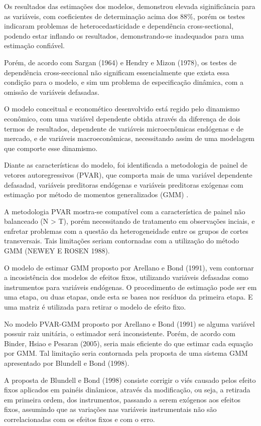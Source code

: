 \documentclass[12pt,12pt,openright,oneside,a4paper,chapter=TITLE,section=TITLE,subsection=TITLE,subsubsection=TITLE,english,french,spanish,portugues,sumario=tradicional]{abntex2}
\begin{document}
Os resultados das estimações dos modelos, demonstrou elevada siginificância para as variáveis, com coeficientes de determinação acima dos 88\%, porém os testes indicaram problemas de heterocedasticidade e dependência cross-sectional, podendo estar inflando os resultados, demonstrando-se inadequados para uma estimação confiável.

Porém, de acordo com Sargan (1964) e Hendry e Mizon (1978), os testes de dependência cross-seccional não significam essencialmente que exista essa condição para o modelo, e sim um problema de especificação dinâmica, com a omissão de variáveis defasadas.

O modelo conceitual e economético desenvolvido está regido pelo dinamismo econômico, com uma variável dependente obtida através da diferença de dois termos de resultados, dependente de variáveis microecnômicas endógenas e de mercado, e de variáveis macroeconômicas, necessitando assim de uma modelagem que comporte esse dinamismo.

Diante as características do modelo, foi identificada a metodologia de painel de vetores autoregressivos (PVAR), que comporta mais de uma variável dependente defasadad, variáveis preditoras endógenas e variáveis preditoras exógenas com estimação por método de momentos generalizados (GMM) .

A metodologia PVAR mostra-se compatível com a característica de painel não balanceado (N \textgreater{} T), porém necessitando de tratamento em observações inciais, e enfretar problemas com a questão da heterogeneidade entre os grupos de cortes transversais. Tais limitações seriam contornadas com a utilização do método GMM (\uppercase{Newey e Rosen} 1988).

O modelo de estimar GMM proposto por Arellano e Bond (1991), vem contornar a incosistência dos modelos de efeitos fixos, utilizando variáveis defasadas como instrumentos para variáveis endógenas. O procedimento de estimação pode ser em uma etapa, ou duas etapas, onde esta se basea nos resíduos da primeira etapa. E uma matriz é utilizada para retirar o modelo de efeito fixo.

No modelo PVAR-GMM proposto por Arellano e Bond (1991) se alguma variável possuir raiz unitária, o estimador será inconsistente. Porém, de acordo com Binder, Hsiao e Pesaran (2005), seria mais eficiente do que estimar cada equação por GMM. Tal limitação seria contornada pela proposta de uma sistema GMM apresentado por Blundell e Bond (1998).

A proposta de Blundell e Bond (1998) consiste corrigir o viés causado pelos efeito fixos aplicados em painéis dinâmicos, através da modificação, ou seja, a retirada em primeira ordem, dos instrumentos, passando a serem exógenos aos efeitos fixos, assumindo que as variações nas variáveis instrumentais não são correlacionadas com os efeitos fixos e com o erro.
\end{document}
